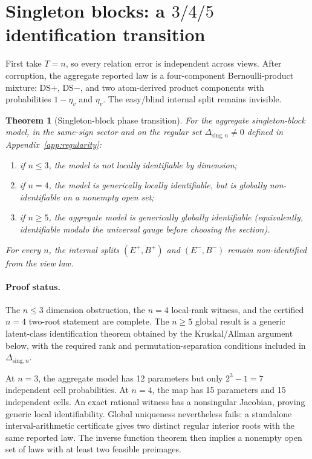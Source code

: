 \documentclass[11pt]{article}
\newtheorem{theorem}{Theorem}
\theoremstyle{definition}
\theoremstyle{remark}
\begin{document}
\section{Singleton blocks: a $3/4/5$ identification transition}
\label{sec:singleton}

First take $T=n$, so every relation error is independent across views. After corruption, the aggregate reported law is a four-component Bernoulli-product mixture: DS$+$, DS$-$, and two atom-derived product components with probabilities $1-\eta_v$ and $\eta_v$. The easy/blind internal split remains invisible.

\begin{theorem}[Singleton-block phase transition]
\label{thm:singleton}
For the aggregate singleton-block model, in the same-sign sector and on the regular set $\Delta_{\mathrm{sing},n}\neq0$ defined in Appendix~\ref{app:regularity}:
\begin{enumerate}
\item if $n\le3$, the model is not locally identifiable by dimension;
\item if $n=4$, the model is generically locally identifiable, but is globally non-identifiable on a nonempty open set;
\item if $n\ge5$, the aggregate model is generically globally identifiable (equivalently, identifiable modulo the universal gauge before choosing the section).
\end{enumerate}
For every $n$, the internal splits $(E^+,B^+)$ and $(E^-,B^-)$ remain non-identified from the view law.
\end{theorem}

\paragraph{Proof status.}
The $n\le3$ dimension obstruction, the $n=4$ local-rank witness, and the certified $n=4$ two-root statement are complete. The $n\ge5$ global result is a generic latent-class identification theorem obtained by the Kruskal/Allman argument below, with the required rank and permutation-separation conditions included in $\Delta_{\mathrm{sing},n}$.

At $n=3$, the aggregate model has 12 parameters but only $2^3-1=7$ independent cell probabilities. At $n=4$, the map has 15 parameters and 15 independent cells. An exact rational witness has a nonsingular Jacobian, proving generic local identifiability. Global uniqueness nevertheless fails: a standalone interval-arithmetic certificate gives two distinct regular interior roots with the same reported law. The inverse function theorem then implies a nonempty open set of laws with at least two feasible preimages.
\end{document}
